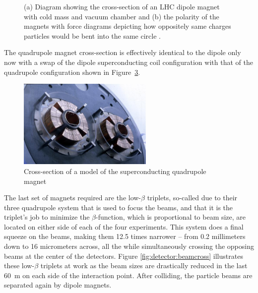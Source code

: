 \begin{figure}[ht]
\begin{subfigure}[b]{0.34\textwidth}
      \caption{}
      \label{fig:detector:dipolefield}
    \end{subfigure}
  \caption[Diagram showing the cross-section of an LHC dipole magnet.]
          {(a) Diagram showing the cross-section of an LHC dipole magnet with cold mass and vacuum chamber and (b) the polarity of the magnets with force diagrams depicting how oppositely same charges particles would be bent into the same circle \cite{Team:40524}\cite{Dipole}.}
      \label{fig:detector:dipole}
\end{figure}
The quadrupole magnet cross-section is effectively identical to the dipole only now with a swap of the dipole superconducting coil configuration with that of the quadrupole configuration shown in Figure~\ref{fig:detector:quadrupole}.
\begin{figure}[ht]
  \begin{center}
    \includegraphics[width=0.58\textwidth]{figs/detector/quadrupole.png}
  \end{center}
  \caption[Cross-section of a model of the superconducting quadrupole magnet]{Cross-section of a model of the superconducting quadrupole magnet~\cite{Laurent:40918}}
  \label{fig:detector:quadrupole}
\end{figure}
The last set of magnets required are the low-$\beta$ triplets, so-called due to their three quadrupole system that is used to focus the beams, and that it is the triplet's job to minimize the $\beta$-function, which is proportional to beam size, are located on either side of each of the four experiments.
This system does a final squeeze on the beams, making them 12.5 times narrower – from 0.2 millimeters down to 16 micrometers across, all the while simultaneously crossing the opposing beams at the center of the detectors.
Figure \ref{fig:detector:beamcross} illustrates these low-$\beta$ triplets at work as the beam sizes are drastically reduced in the last 60~m on each side of the interaction point.
After colliding, the particle beams are separated again by dipole magnets.
